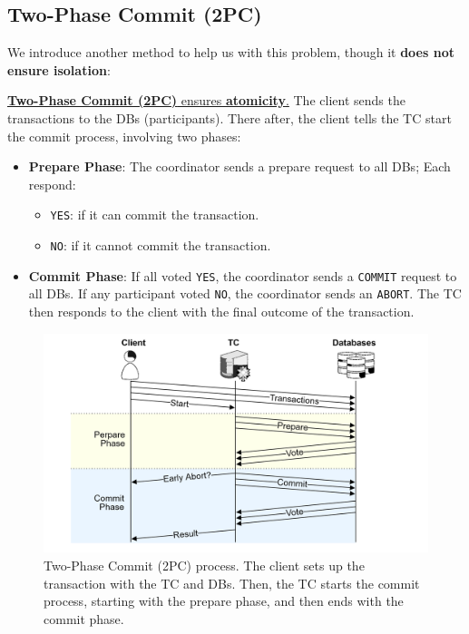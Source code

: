    \newpage 

\subsection{Two-Phase Commit (2PC)}
\noindent
We introduce another method to help us with this problem, though it \textbf{does not ensure isolation}:

\begin{Def}

    \underline{\textbf{Two-Phase Commit (2PC)} ensures \textbf{atomicity}.}
    The client sends the transactions to the DBs (participants). There after, the client tells the TC start the commit process, involving two phases:
    
    \begin{itemize}
        \item \textbf{Prepare Phase}: The coordinator sends a prepare request to all DBs; Each respond:
        \begin{itemize}
            \item \texttt{YES}: if it can commit the transaction.
            \item \texttt{NO}: if it cannot commit the transaction.
        \end{itemize}
        \item \textbf{Commit Phase}: If all voted \texttt{YES}, the coordinator sends a \texttt{COMMIT} request to all DBs. If any participant voted \texttt{NO}, the coordinator sends an \texttt{ABORT}.
        The TC then responds to the client with the final outcome of the transaction.
    \end{itemize}
\end{Def}

\begin{figure}[h]
    \centering
    \includegraphics[width=\textwidth]{Sections/trans/2PC.png}
    \caption{Two-Phase Commit (2PC) process. The client sets up the transaction with the TC and DBs. Then, the TC starts the 
    commit process, starting with the prepare phase, and then ends with the commit phase.}
    \label{fig:2pc}
\end{figure}

